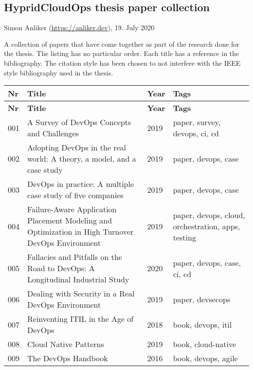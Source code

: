 \documentclass[11pt,a4paper]{article}
\begin{document}
    \subsection*{HypridCloudOps thesis paper collection}
    Simon Anliker (\url{https://anliker.dev}), 19. July 2020

    A collection of papers that have come together as part of the research done for the thesis.
    The listing has no particular order.
    Each title has a reference in the bibliography.
    The citation style has been chosen to not interfere with the IEEE style bibliography used in the thesis.
    \\

    \begin{longtable}{L{0.6cm}L{7.5cm}L{0.9cm}L{4cm}}
        \toprule \midrule \textbf{Nr} & \textbf{Title} & \textbf{Year} & \textbf{Tags} \\ \midrule \endfirsthead
        \toprule \textbf{Nr} & \textbf{Title} & \textbf{Year} & \textbf{Tags} \\ \midrule {} & A Survey of DevOps Concepts and Challenges\cite{coll:001} & 2019 & paper, survey, devops, ci, cd \\  & Adopting DevOps in the real world: A theory, a model, and a case study\cite{coll:002} & 2019 & paper, devops, case \\  & DevOps in practice: A multiple case study of five companies\cite{coll:003} & 2019 & paper, devops, case \\  & Failure-Aware Application Placement Modeling and Optimization in High Turnover DevOps Environment\cite{coll:004} & 2019 & paper, devops, cloud, orchestration, apps, testing \\  & Fallacies and Pitfalls on the Road to DevOps: A Longitudinal Industrial Study\cite{coll:005} & 2020 & paper, devops, case, ci, cd \\  & Dealing with Security in a Real DevOps Environment\cite{coll:006} & 2019 & paper, devsecops \\  & Reinventing ITIL in the Age of DevOps\cite{coll:007} & 2018 & book, devops, itil \\  & Cloud Native Patterns\cite{coll:008} & 2019 & book, cloud-native \\  & The DevOps Handbook\cite{coll:009} & 2016 & book, devops, agile \\ \midrule

\end{longtable}
\end{document}

